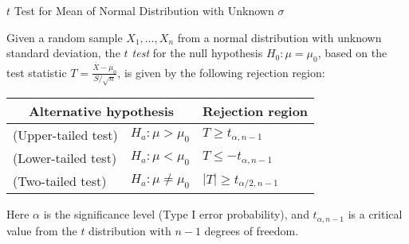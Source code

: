\documentclass[t,handout]{beamer}
\begin{document}
\begin{frame}{$t$ Test for Mean of Normal Distribution with Unknown $\sigma$ }
    \begin{block}{}
        Given a random sample $X_1,\dots,X_n$ from a normal distribution with unknown standard deviation, the \emph{$t$ test} for the null hypothesis $H_0: \mu=\mu_0$, based on the test statistic $T=\frac{\overline X-\mu_0}{S/\sqrt{n}}$, is given by the following rejection region:
        \begin{center}
            \begin{tabular}{ll|l}
                \multicolumn{2}{c}{Alternative hypothesis} & Rejection region                                 \\ \hline
                (Upper-tailed test)                        & $H_a: \mu>\mu_0$    & $T\geq t_{\alpha,n-1}$     \\
                (Lower-tailed test)                        & $H_a: \mu<\mu_0$    & $T\leq -t_{\alpha,n-1}$    \\
                (Two-tailed test)                          & $H_a: \mu\neq\mu_0$ & $|T|\geq t_{\alpha/2,n-1}$ \\
            \end{tabular}
        \end{center}
        Here $\alpha$ is the significance level (Type I error probability), and $t_{\alpha,n-1}$ is a critical value from the $t$ distribution with $n-1$ degrees of freedom.
    \end{block}
\end{frame}
\end{document}
